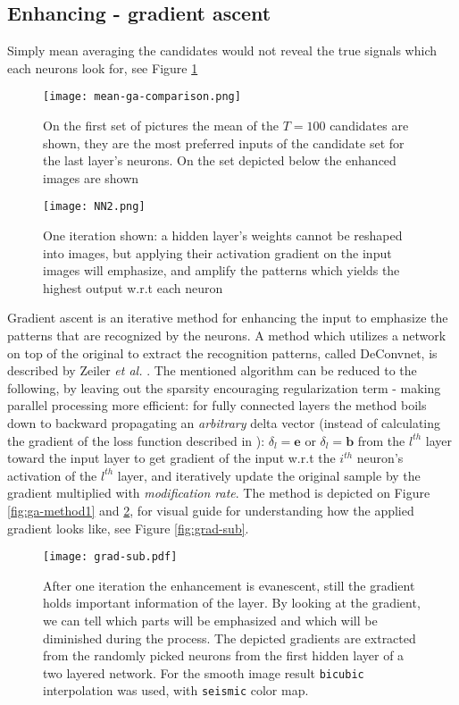 \subsection{Enhancing - gradient ascent}

Simply mean averaging the candidates would not reveal the true signals which each neurons look for, see Figure \ref{fig:mean-ga-comp}

\begin{figure}
    \centering
    \texttt{[image: mean-ga-comparison.png]}
    \caption{On the first set of pictures the mean of the $T=100$ candidates are shown, they are the most preferred inputs of the candidate set for the last layer's neurons. On the set depicted below the enhanced images are shown}
    \label{fig:mean-ga-comp}
\end{figure}
\begin{figure}
    \centering
    \texttt{[image: NN2.png]}
    \caption{One iteration shown: a hidden layer's weights cannot be reshaped into images, but applying their activation gradient on the input images will emphasize, and amplify the patterns which yields the highest output w.r.t each neuron}
    \label{fig:ga-method2}
\end{figure}
Gradient ascent is an iterative method for enhancing the input to emphasize the patterns that are recognized by the neurons. A method which utilizes a network on top of the original to extract the recognition patterns, called DeConvnet, is described by Zeiler \emph{et al.} \cite{zeiler2014visualizing}. The mentioned algorithm can be reduced to the following, by leaving out the sparsity encouraging regularization term - making parallel processing more efficient:
for fully connected layers the method boils down to backward propagating an \emph{arbitrary} delta vector (instead of calculating the gradient of the loss function described in \cite{zeiler2014visualizing}): 
$\delta_l = \mathbf{e}$ or $\delta_l =\mathbf{b}$
from the $l^{th}$ layer toward the input layer to get gradient of the input w.r.t the $i^{th}$ neuron's activation of the $l^{th}$ layer, and iteratively update the original sample by the gradient multiplied with \emph{modification rate}. The method is depicted on Figure \ref{fig:ga-method1} and \ref{fig:ga-method2}, 
for visual guide for understanding how the applied gradient looks like, see Figure \ref{fig:grad-sub}.

\begin{figure}
    \centering
    \texttt{[image: grad-sub.pdf]}
    \caption{After one iteration the enhancement is evanescent, still the gradient holds important information of the layer.
    By looking at the gradient, we can tell which parts will be emphasized and which will be diminished during the process.
    The depicted gradients are extracted from the randomly picked neurons from the first hidden layer of a two layered network.
    For the smooth image result \texttt{bicubic} interpolation was used, with \texttt{seismic} color map.
    }
    \label{fig:bias-nobias}
\end{figure}


